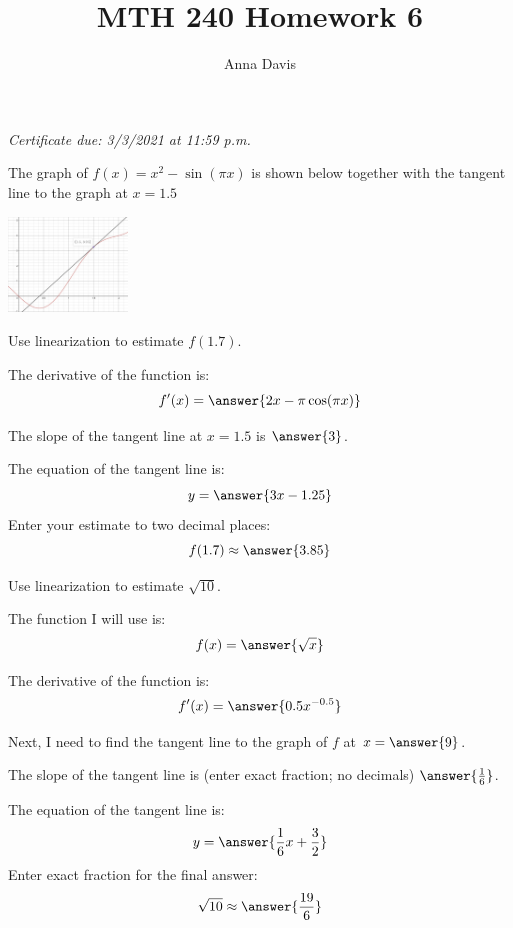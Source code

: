 \documentclass{ximera}
\author{Anna Davis} \title{MTH 240 Homework 6}
\begin{document}
\begin{abstract}

\end{abstract}
\maketitle
 \textit{Certificate due: 3/3/2021 at 11:59 p.m.}
 
 \begin{problem}\label{prob:240hom6prob2}
The graph of $f(x)=x^2-\sin(\pi x)$ is shown below together with the tangent line to the graph at $x=1.5$  
\begin{image}
   
\includegraphics[height=1in]{HW6pic1.jpg}~
 
\end{image}

Use linearization to estimate $f(1.7)$.

The derivative of the function is:
$$f'(x)=\answer{2x-\pi\cos(\pi x)}$$

The slope of the tangent line at $x=1.5$ is  $\answer{3}$.

The equation of the tangent line is:
$$y=\answer{3x-1.25}$$
Enter your estimate to two decimal places:
$$f(1.7)\approx \answer{3.85}$$
 
 \end{problem}
 
 \begin{problem}\label{prob:240hom6prob3}
 Use linearization to estimate $\sqrt{10}$.

The function I will use is:
$$f(x)=\answer{\sqrt{x}}$$

The derivative of the function is:
$$f'(x)=\answer{0.5x^{-0.5}}$$

Next, I need to find the tangent line to the graph of $f$ at $x=\answer{9}$.

The slope of the tangent line is (enter exact fraction; no decimals) $\answer{\frac{1}{6}}$.

The equation of the tangent line is:
$$y=\answer{\frac{1}{6}x+\frac{3}{2}}$$
Enter exact fraction for the final answer:
$$\sqrt{10}\approx \answer{\frac{19}{6}}$$
 \end{problem}
 
\end{document}

